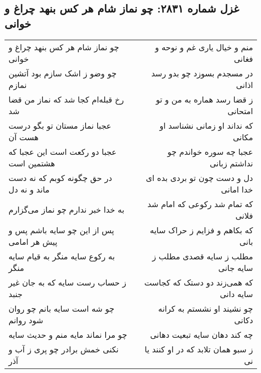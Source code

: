 \begin{center}
\section*{غزل شماره ۲۸۳۱: چو نماز شام هر کس بنهد چراغ و خوانی}
\label{sec:2831}
\begin{longtable}{l p{0.5cm} r}
چو نماز شام هر کس بنهد چراغ و خوانی
&&
منم و خیال یاری غم و نوحه و فغانی
\\
چو وضو ز اشک سازم بود آتشین نمازم
&&
در مسجدم بسوزد چو بدو رسد اذانی
\\
رخ قبله‌ام کجا شد که نماز من قضا شد
&&
ز قضا رسد هماره به من و تو امتحانی
\\
عجبا نماز مستان تو بگو درست هست آن
&&
که نداند او زمانی نشناسد او مکانی
\\
عجبا دو رکعت است این عجبا که هشتمین است
&&
عجبا چه سوره خواندم چو نداشتم زبانی
\\
در حق چگونه کوبم که نه دست ماند و نه دل
&&
دل و دست چون تو بردی بده ای خدا امانی
\\
به خدا خبر ندارم چو نماز می‌گزارم
&&
که تمام شد رکوعی که امام شد فلانی
\\
پس از این چو سایه باشم پس و پیش هر امامی
&&
که بکاهم و فزایم ز حراک سایه بانی
\\
به رکوع سایه منگر به قیام سایه منگر
&&
مطلب ز سایه قصدی مطلب ز سایه جانی
\\
ز حساب رست سایه که به جان غیر جنبد
&&
که همی‌زند دو دستک که کجاست سایه دانی
\\
چو شه است سایه بانم چو روان شود روانم
&&
چو نشیند او نشستم به کرانه دکانی
\\
چو مرا نماند مایه منم و حدیث سایه
&&
چه کند دهان سایه تبعیت دهانی
\\
نکنی خمش برادر چو پری ز آب و آذر
&&
ز سبو همان تلابد که در او کنند یا نی
\\
\end{longtable}
\end{center}
